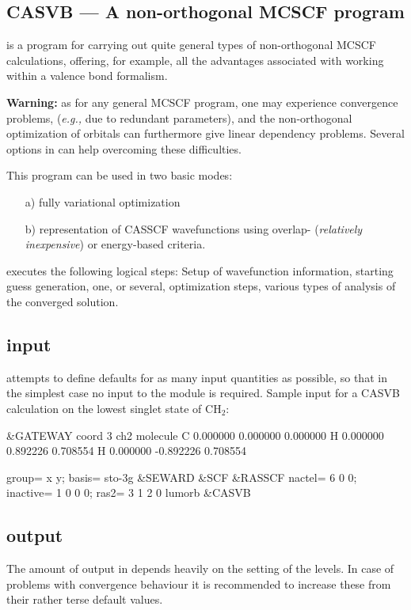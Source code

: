 \subsection{CASVB --- A non-orthogonal MCSCF program} 
\label{TUT:sec:casvb}
 is a program for carrying out quite general types of 
non-orthogonal MCSCF calculations, offering, for example, all the advantages 
associated with working within a valence bond formalism.

{\bf Warning:} as for any general MCSCF program, one may experience convergence 
problems, ({\em e.g.,}\/ due to redundant parameters), and the non-orthogonal 
optimization of orbitals can furthermore give linear dependency problems. 
Several options in  can help overcoming these difficulties.

This program can be used in two basic modes:
\begin{itemize}
\item[a)] fully variational optimization
\item[b)] representation of CASSCF wavefunctions using
   overlap- ({\em relatively inexpensive\/}) or energy-based criteria.
\end{itemize}

 executes the following logical steps:
Setup of wavefunction information, starting guess generation, one, or several,
optimization steps, various types of analysis of the converged solution.

\subsection{ input}
 attempts to define defaults for as many input quantities as 
possible, so that in the simplest case no input to the  module 
is required.
Sample input for a CASVB calculation on the lowest singlet state of CH$_2$:
\begin{inputlisting}
 &GATEWAY
coord
3
ch2 molecule
C 0.000000  0.000000 0.000000
H 0.000000  0.892226 0.708554
H 0.000000 -0.892226 0.708554

group= x y; basis= sto-3g
 &SEWARD
 &SCF
 &RASSCF
nactel= 6 0 0; inactive= 1 0 0 0; ras2= 3 1 2 0
lumorb
 &CASVB
\end{inputlisting}

\subsection{ output}
The amount of output in  depends heavily on the setting of the
 levels. In case of problems with convergence behaviour it is
recommended to increase these from their rather terse default values.

